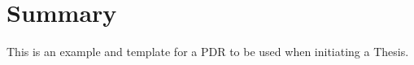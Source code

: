 \chapter{Summary}
This is an example and template for a \acf{PDR} to be used when initiating a Thesis.

\noindent
{}
